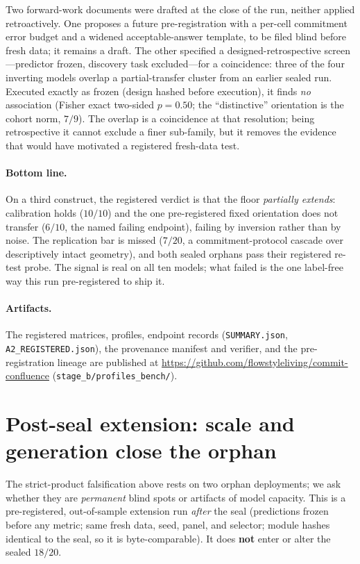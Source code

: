 \documentclass[11pt]{article}
\begin{document}
Two forward-work documents were drafted at the close of the run, neither applied retroactively. One
proposes a future pre-registration with a per-cell commitment error budget and a widened
acceptable-answer template, to be filed blind before fresh data; it remains a draft. The other
specified a designed-retrospective screen---predictor frozen, discovery task excluded---for a
coincidence: three of the four inverting models overlap a partial-transfer cluster from an earlier
sealed run. Executed exactly as frozen (design hashed before execution), it finds \emph{no}
association (Fisher exact two-sided $p=0.50$; the ``distinctive'' orientation is the cohort norm,
$7/9$). The overlap is a coincidence at that resolution; being retrospective it cannot exclude a
finer sub-family, but it removes the evidence that would have motivated a registered fresh-data
test.

\paragraph{Bottom line.} On a third construct, the registered verdict is
that the floor \emph{partially extends}: calibration holds ($10/10$) and the one pre-registered
fixed orientation does not transfer ($6/10$, the named failing endpoint), failing by inversion
rather than by noise. The replication bar is missed ($7/20$, a commitment-protocol cascade over
descriptively intact geometry), and both sealed orphans pass their registered re-test probe. The
signal is real on all ten models; what failed is the one label-free way this run pre-registered
to ship it.

\paragraph{Artifacts.} The registered matrices, profiles, endpoint records
(\texttt{SUMMARY.json}, \texttt{A2\_REGISTERED.json}), the provenance manifest and verifier, and
the pre-registration lineage are published at
\url{https://github.com/flowstyleliving/commit-confluence} (\texttt{stage\_b/profiles\_bench/}).

\FloatBarrier
\section{Post-seal extension: scale and generation close the orphan}
\label{sec:scale}

The strict-product falsification above rests on two orphan deployments; we ask whether they are
\emph{permanent} blind spots or artifacts of model capacity. This is a pre-registered, out-of-sample
extension run \emph{after} the seal (predictions frozen before any metric; same fresh data, seed,
panel, and selector; module hashes identical to the seal, so it is byte-comparable). It does
\textbf{not} enter or alter the sealed $18/20$.
\end{document}
